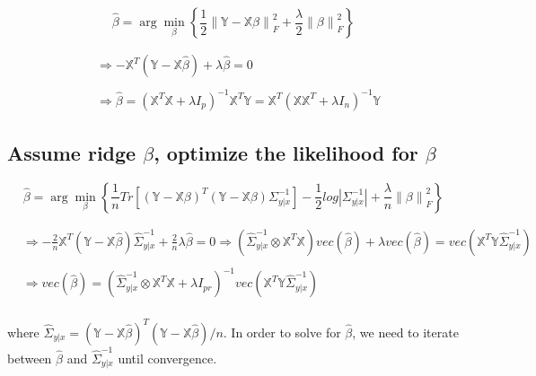 \documentclass[11pt,]{book}
\theoremstyle{definition}
\theoremstyle{definition}
\theoremstyle{definition}
\theoremstyle{remark}
\begin{document}
\[ \hat{\beta} = \arg\min_{\beta}\left\{\frac{1}{2} \left\| \mathbb{Y} - \mathbb{X}\beta \right\|_{F}^{2} + \frac{\lambda}{2}\left\| \beta \right\|_{F}^{2}\right\} \]

\begin{align*}
  &\Rightarrow -\mathbb{X}^{T}\left( \mathbb{Y} - \mathbb{X}\hat{\beta} \right) + \lambda\hat{\beta} = 0 \\
  & \\
  &\Rightarrow \hat{\beta} = \left( \mathbb{X}^{T}\mathbb{X} + \lambda I_{p} \right)^{-1}\mathbb{X}^{T}\mathbb{Y} = \mathbb{X}^{T}\left( \mathbb{X}\mathbb{X}^{T} + \lambda I_{n} \right)^{-1}\mathbb{Y}
\end{align*}

\vspace{0.5cm}

\hypertarget{assume-ridge-beta-optimize-the-likelihood-for-beta}{%
\subsection{\texorpdfstring{Assume ridge \(\beta\), optimize the
likelihood for
\(\beta\)}{Assume ridge \textbackslash{}beta, optimize the likelihood for \textbackslash{}beta}}\label{assume-ridge-beta-optimize-the-likelihood-for-beta}}

\[ \hat{\beta} = \arg\min_{\beta}\left\{ \frac{1}{n} Tr\left[ \left(\mathbb{Y} - \mathbb{X}\beta \right)^{T}\left( \mathbb{Y} - \mathbb{X}\beta \right)\Sigma_{y | x}^{-1} \right] - \frac{1}{2}log\left| \Sigma_{y | x}^{-1} \right| + \frac{\lambda}{n}\left\| \beta \right\|_{F}^{2} \right\} \]

\begin{align*}
  &\Rightarrow -\frac{2}{n}\mathbb{X}^{T}\left( \mathbb{Y} - \mathbb{X}\hat{\beta} \right)\hat{\Sigma}_{y | x}^{-1} + \frac{2}{n}\lambda\hat{\beta} = 0 \Rightarrow \left( \hat{\Sigma}_{y | x}^{-1} \otimes \mathbb{X}^{T}\mathbb{X} \right)vec\left( \hat{\beta} \right) + \lambda vec\left( \hat{\beta} \right) = vec\left( \mathbb{X}^{T}\mathbb{Y}\hat{\Sigma}_{y | x}^{-1} \right) \\
  & \\
  &\Rightarrow vec\left( \hat{\beta} \right) = \left( \hat{\Sigma}_{y | x}^{-1} \otimes \mathbb{X}^{T}\mathbb{X} + \lambda I_{pr} \right)^{-1}vec\left( \mathbb{X}^{T}\mathbb{Y}\hat{\Sigma}_{y | x}^{-1} \right) \\
\end{align*}

where
\(\hat{\Sigma}_{y | x} = (\mathbb{Y} - \mathbb{X}\hat{\beta} )^{T}(\mathbb{Y} - \mathbb{X}\hat{\beta})/n\).
In order to solve for \(\hat{\beta}\), we need to iterate between
\(\hat{\beta}\) and \(\hat{\Sigma}_{y | x}^{-1}\) until convergence.
\end{document}
